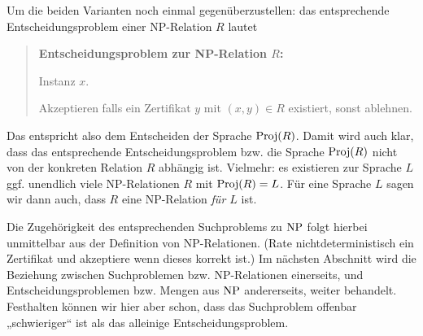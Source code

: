 Um die beiden Varianten noch einmal gegenüberzustellen: das entsprechende Entscheidungsproblem einer NP-Relation $R$ lautet
\begin{quote}
    \textbf{Entscheidungsproblem zur NP-Relation $R$:}
    \begin{description}[nosep]
        \item[Gegeben:] Instanz $x$.
        \item[Gesucht:] Akzeptieren falls ein Zertifikat $y$ mit $(x,y)\in  R$ existiert, sonst ablehnen.
    \end{description}
\end{quote}
Das entspricht also dem Entscheiden der Sprache $\operatorname{Proj}(R)$. Damit wird auch klar, dass das entsprechende Entscheidungsproblem bzw. die Sprache $\operatorname{Proj}(R)$ nicht von der konkreten Relation $R$ abhängig ist. Vielmehr: es existieren zur Sprache $L$ ggf. unendlich viele NP-Relationen $R$ mit $\operatorname{Proj}(R)=L$.  Für eine Sprache $L$ sagen wir dann auch, dass $R$ eine NP-Relation \emph{für $L$} ist.

Die Zugehörigkeit des entsprechenden Suchproblems zu $\mathrm{NP}$ folgt hierbei unmittelbar aus der Definition von NP-Relationen. (Rate nichtdeterministisch ein Zertifikat und akzeptiere wenn dieses korrekt ist.)
Im nächsten Abschnitt wird die Beziehung zwischen Suchproblemen bzw. NP-Relationen einerseits, und Entscheidungsproblemen bzw. Mengen aus $\mathrm{NP}$ andererseits, weiter behandelt.
Festhalten können wir hier aber schon, dass das Suchproblem offenbar „schwieriger“ ist als das alleinige Entscheidungsproblem.

